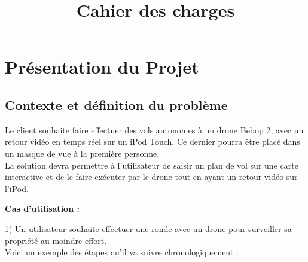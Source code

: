 \documentclass{article}
\title{Cahier des charges}
\begin{document}
\sectionfont{\underline}

\maketitle
\section{Présentation du Projet}
	\subsection{Contexte et définition du problème}
		Le client souhaite faire effectuer des vols autonomes à un drone Bebop 2, avec un retour vidéo en temps réel sur un iPod Touch. Ce dernier pourra être placé dans un masque de vue à la première personne.\\
		La solution devra permettre à l'utilisateur de saisir un plan de vol sur une carte interactive et de le faire exécuter par le drone tout en ayant un retour vidéo sur l'iPod.\\
		\medbreak
        \begin{flushleft}
	        \textbf{Cas d'utilisation :} \\
	    \end{flushleft}
	    \begin{flushleft}
	    1) Un utilisateur souhaite effectuer une ronde avec un drone pour surveiller sa propriété au moindre effort.\\
	    Voici un exemple des étapes qu'il va suivre chronologiquement :\\
	     \end{flushleft}
\end{document}
